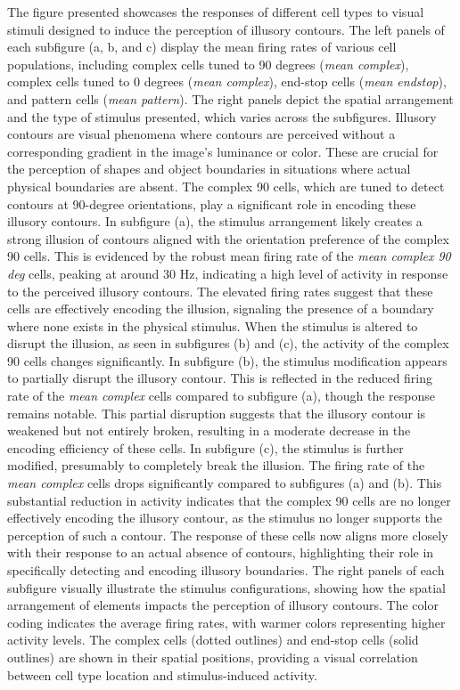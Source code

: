 \documentclass[12pt]{article}
\begin{document}
The figure presented showcases the responses of different cell types to visual stimuli designed to induce the perception of illusory contours. The left panels of each subfigure (a, b, and c) display the mean firing rates of various cell populations, including complex cells tuned to 90 degrees (\textit{mean complex}), complex cells tuned to 0 degrees (\textit{mean complex}), end-stop cells (\textit{mean endstop}), and pattern cells (\textit{mean pattern}). The right panels depict the spatial arrangement and the type of stimulus presented, which varies across the subfigures. Illusory contours are visual phenomena where contours are perceived without a corresponding gradient in the image's luminance or color. These are crucial for the perception of shapes and object boundaries in situations where actual physical boundaries are absent. The complex 90 cells, which are tuned to detect contours at 90-degree orientations, play a significant role in encoding these illusory contours.
\bigbreak
In subfigure (a), the stimulus arrangement likely creates a strong illusion of contours aligned with the orientation preference of the complex 90 cells. This is evidenced by the robust mean firing rate of the \textit{mean complex 90 deg} cells, peaking at around 30 Hz, indicating a high level of activity in response to the perceived illusory contours. The elevated firing rates suggest that these cells are effectively encoding the illusion, signaling the presence of a boundary where none exists in the physical stimulus. When the stimulus is altered to disrupt the illusion, as seen in subfigures (b) and (c), the activity of the complex 90 cells changes significantly. In subfigure (b), the stimulus modification appears to partially disrupt the illusory contour. This is reflected in the reduced firing rate of the \textit{mean complex} cells compared to subfigure (a), though the response remains notable. This partial disruption suggests that the illusory contour is weakened but not entirely broken, resulting in a moderate decrease in the encoding efficiency of these cells.
\bigbreak
In subfigure (c), the stimulus is further modified, presumably to completely break the illusion. The firing rate of the \textit{mean complex} cells drops significantly compared to subfigures (a) and (b). This substantial reduction in activity indicates that the complex 90 cells are no longer effectively encoding the illusory contour, as the stimulus no longer supports the perception of such a contour. The response of these cells now aligns more closely with their response to an actual absence of contours, highlighting their role in specifically detecting and encoding illusory boundaries. The right panels of each subfigure visually illustrate the stimulus configurations, showing how the spatial arrangement of elements impacts the perception of illusory contours. The color coding indicates the average firing rates, with warmer colors representing higher activity levels. The complex cells (dotted outlines) and end-stop cells (solid outlines) are shown in their spatial positions, providing a visual correlation between cell type location and stimulus-induced activity.
\end{document}
